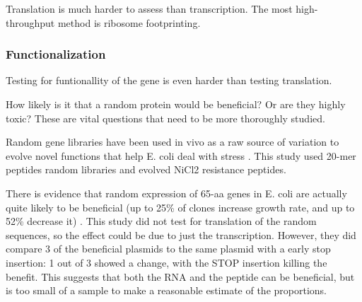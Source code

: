Translation is much harder to assess than transcription. The most
high-throughput method is ribosome footprinting. 


\subsubsection{Functionalization}

Testing for funtionallity of the gene is even harder than testing translation.

How likely is it that a random protein would be beneficial? Or are they highly
toxic? These are vital questions that need to be more thoroughly studied.

Random gene libraries have been used in vivo as a raw source of variation to
evolve novel functions that help E. coli deal with stress
\cite{stepanov2007stress}. This study used 20-mer peptides random libraries and
evolved NiCl2 resistance peptides.

There is evidence that random expression of 65-aa genes in E. coli are actually
quite likely to be beneficial (up to 25\% of clones increase growth rate, and
up to 52\% decrease it) \cite{neme2017random}. This study did not test for
translation of the random sequences, so the effect could be due to just the
transcription. However, they did compare 3 of the beneficial plasmids to the
same plasmid with a early stop insertion: 1 out of 3 showed a change, with the
STOP insertion killing the benefit. This suggests that both the RNA and the
peptide can be beneficial, but is too small of a sample to make a reasonable
estimate of the proportions. 


